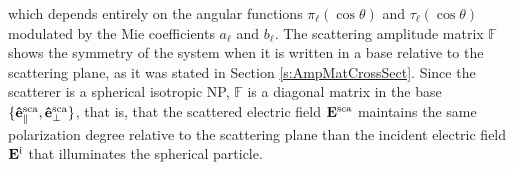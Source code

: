 %
\noindent
which depends entirely on the angular functions $\pi_\ell(\cos\theta)$ and $\tau_\ell(\cos\theta)$ modulated by the Mie coefficients $a_\ell$ and $b_\ell$. The scattering amplitude matrix $\mathbb{F}$ shows the symmetry of the system when it is written in a base relative to the scattering plane, as it was stated in Section \ref{s:AmpMatCrossSect}. Since the scatterer is a spherical isotropic NP,  $\mathbb{F}$ is a diagonal matrix in the base  $\{\vu{e}^\text{sca}_\parallel, \vu{e}^\text{sca}_\perp  \}$, that is, that the scattered electric field $\vb{E}^\text{sca}$ maintains the same polarization degree relative to the scattering plane than the incident electric field $\vb{E}^\text{i}$ that illuminates the spherical particle.
